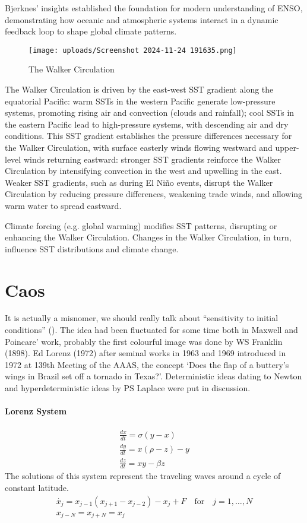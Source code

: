 Bjerknes’ insights established the foundation for modern understanding of ENSO, demonstrating how oceanic and atmospheric systems interact in a dynamic feedback loop to shape global climate patterns.
\begin{figure}[htpb]
	\centering
	\texttt{[image: uploads/Screenshot 2024-11-24 191635.png]}
	\caption{The Walker Circulation}

\end{figure}
The Walker Circulation is driven by the east-west SST gradient along the equatorial Pacific: warm SSTs in the western Pacific generate low-pressure systems, promoting rising air and convection (clouds and rainfall); cool SSTs in the eastern Pacific lead to high-pressure systems, with descending air and dry conditions.
This SST gradient establishes the pressure differences necessary for the Walker Circulation, with surface easterly winds flowing westward and upper-level winds returning eastward: stronger SST gradients reinforce the Walker Circulation by intensifying convection in the west and upwelling in the east. Weaker SST gradients, such as during El Niño events, disrupt the Walker Circulation by reducing pressure differences, weakening trade winds, and allowing warm water to spread eastward.

Climate forcing (e.g. global warming) modifies SST patterns, disrupting or enhancing the Walker Circulation. Changes in the Walker Circulation, in turn, influence SST distributions and climate change.
\section{Caos}
It is actually a misnomer, we should really talk about “sensitivity to initial conditions” (\cite{Tanner2020}).
The idea had been fluctuated for some time both in Maxwell and Poincare’ work, probably the first colourful image was done by WS Franklin (1898). Ed Lorenz (1972) after seminal works in 1963 and 1969 introduced in 1972 at 139th Meeting of the AAAS, the concept ‘Does the flap of a buttery’s wings in Brazil set off a tornado in Texas?’.
Deterministic ideas dating to Newton and hyperdeterministic ideas by PS Laplace were put in discussion.
\paragraph{Lorenz System}
\begin{align}\label{eq.lorenz system}
	\frac{dx}{dt}=\sigma(y-x) \\
	\frac{dy}{dt}=x(\rho-z)-y \\
	\frac{dz}{dt}=xy-\beta z
\end{align}
The solutions of this system represent the traveling waves around a cycle of constant latitude.
\begin{align*}
	\dot{x_j}=x_{j-1}(x_{j+1}-x_{j-2})-x_j+F \quad \text{for} \quad j=1,\dots,N \\
	x_{j-N}=x_{j+N}=x_j
\end{align*}
